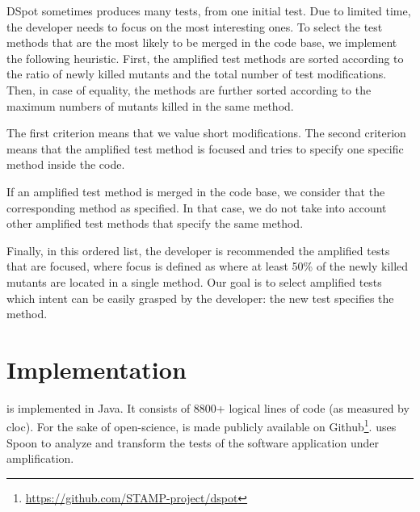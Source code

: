 DSpot  sometimes produces many tests, from one initial test.
Due to limited time, the developer needs to focus on the most interesting ones.
To select the test methods that are the most likely to be merged in the code base, we implement the following  heuristic.
First, the amplified test methods are sorted according to the ratio of newly killed mutants and the total number of test modifications.
Then, in case of equality, the methods are further sorted according to the maximum numbers of mutants killed in the same method.

The first criterion means that we value short modifications.
The second criterion means that the amplified test method is focused and tries to specify one specific method inside the code.

If an amplified test method is merged in the code base, we consider that the corresponding method as specified. In that case, we do not take into account other amplified test methods that specify the same method.

Finally, in this ordered list, the developer is recommended the amplified tests that are focused, where focus is defined as where at least 50\% of the newly killed mutants are located in a single method. Our goal is to select amplified tests which intent can be easily grasped by the developer: the new test specifies the method.

\section{Implementation}

\dspot is implemented in Java.
It consists of 8800+ logical lines of code (as measured by cloc).
For the sake of open-science, \dspot is made publicly available on Github\footnote{\url{https://github.com/STAMP-project/dspot}}.
\dspot uses Spoon\cite{pawlak:hal-01169705} to analyze and transform the tests of the software application under amplification.